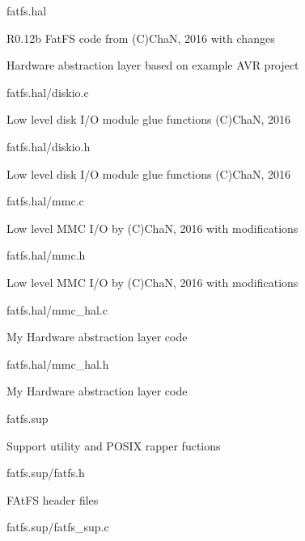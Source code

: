 \begin{DoxyItemize}
\begin{DoxyItemize}
\end{DoxyItemize}
\item fatfs.\+hal
\begin{DoxyItemize}
\item R0.\+12b Fat\+FS code from (C)ChaN, 2016 with changes
\item Hardware abstraction layer based on example A\+VR project
\item fatfs.\+hal/diskio.c
\begin{DoxyItemize}
\item Low level disk I/O module glue functions (C)ChaN, 2016
\end{DoxyItemize}
\item fatfs.\+hal/diskio.h
\begin{DoxyItemize}
\item Low level disk I/O module glue functions (C)ChaN, 2016
\end{DoxyItemize}
\item fatfs.\+hal/mmc.c
\begin{DoxyItemize}
\item Low level M\+MC I/O by (C)ChaN, 2016 with modifications
\end{DoxyItemize}
\item fatfs.\+hal/mmc.h
\begin{DoxyItemize}
\item Low level M\+MC I/O by (C)ChaN, 2016 with modifications
\end{DoxyItemize}
\item fatfs.\+hal/mmc\+\_\+hal.c
\begin{DoxyItemize}
\item My Hardware abstraction layer code
\end{DoxyItemize}
\item fatfs.\+hal/mmc\+\_\+hal.h
\begin{DoxyItemize}
\item My Hardware abstraction layer code
\end{DoxyItemize}
\end{DoxyItemize}
\item fatfs.\+sup
\begin{DoxyItemize}
\item Support utility and P\+O\+S\+IX rapper fuctions
\item fatfs.\+sup/fatfs.h
\begin{DoxyItemize}
\item F\+At\+FS header files
\end{DoxyItemize}
\item fatfs.\+sup/fatfs\+\_\+sup.c

\end{DoxyItemize}
\end{DoxyItemize}
